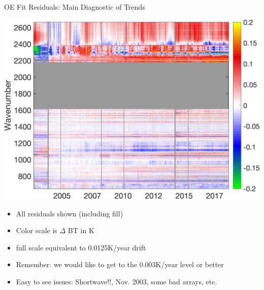 \documentclass[10pt,t]{beamer}
\begin{document}
\begin{frame}[label={sec:org7d021c3}]{OE Fit Residuals:  Main Diagnostic of Trends}
\vspace{-0.1in}
\begin{center}
\includegraphics[width=0.7\linewidth]{./Figs/Png/best_co2_anom_resid.png}
\end{center}

\vspace{-0.1in}
\begin{footnotesize}
\begin{itemize}
\item All residuals shown (including fill)
\item Color scale is \(\Delta\) BT in K
\item \textpm{} full scale equivalent to \textpm{} 0.0125K/year drift
\item Remember: we would like to get to the 0.003K/year level or better
\item Easy to see issues: Shortwave!!, Nov. 2003, some bad arrays, etc.
\end{itemize}

\end{footnotesize}
\end{frame}
\end{document}

